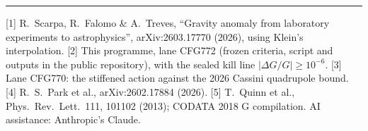 \documentclass[10pt]{article}
\begin{document}
\vspace{4pt}\hrule\vspace{3pt}
{\footnotesize
[1] R.~Scarpa, R.~Falomo \& A.~Treves, ``Gravity anomaly from laboratory experiments to astrophysics'', arXiv:2603.17770 (2026), using Klein's interpolation.
[2] This programme, lane CFG772 (frozen criteria, script and outputs in the public repository), with the sealed kill line $|\Delta G/G|\ge10^{-6}$.
[3] Lane CFG770: the stiffened action against the 2026 Cassini quadrupole bound.
[4] R.~S.~Park et al., arXiv:2602.17884 (2026).
[5] T.~Quinn et al., Phys.\ Rev.\ Lett.\ 111, 101102 (2013); CODATA 2018 G compilation.
AI assistance: Anthropic's Claude.}
\end{document}
